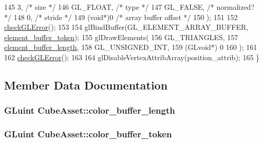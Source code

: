 \begin{DoxyCode}
145                         3,                             \textcolor{comment}{/* size */}
146                         GL\_FLOAT,                      \textcolor{comment}{/* type */}
147                         GL\_FALSE,                      \textcolor{comment}{/* normalized? */}
148                         0,                             \textcolor{comment}{/* stride */}
149                         (\textcolor{keywordtype}{void}*)0                       \textcolor{comment}{/* array buffer offset */}
150                         );
151 
152   \hyperlink{CubeAsset_8cc_a75f201b0e53e68726854997957322b8d}{checkGLError}();
153 
154   glBindBuffer(GL\_ELEMENT\_ARRAY\_BUFFER, \hyperlink{classCubeAsset_a4fae699256e7c5633a8174a93ca8a0ec}{element\_buffer\_token});
155   glDrawElements(
156                  GL\_TRIANGLES,
157                  \hyperlink{classCubeAsset_ac66c2ec869f392515dad4ebda1fe4792}{element\_buffer\_length},
158                  GL\_UNSIGNED\_INT,
159                  (GLvoid*) 0
160                  );
161 
162   \hyperlink{CubeAsset_8cc_a75f201b0e53e68726854997957322b8d}{checkGLError}();
163 
164   glDisableVertexAttribArray(position\_attrib);
165 \}
\end{DoxyCode}


\subsection{Member Data Documentation}
\hypertarget{classCubeAsset_ac4c2395c395e9bcebc5d15d425a505ec}{}
\subsubsection[{color\+\_\+buffer\+\_\+length}]{\setlength{\rightskip}{0pt plus 5cm}G\+Luint Cube\+Asset\+::color\+\_\+buffer\+\_\+length\hspace{0.3cm}{\ttfamily [private]}}\label{classCubeAsset_ac4c2395c395e9bcebc5d15d425a505ec}
\hypertarget{classCubeAsset_a4cb558d463a5fa01ba7fdd884e697a73}{}
\subsubsection[{color\+\_\+buffer\+\_\+token}]{\setlength{\rightskip}{0pt plus 5cm}G\+Luint Cube\+Asset\+::color\+\_\+buffer\+\_\+token\hspace{0.3cm}{\ttfamily [private]}}\label{classCubeAsset_a4cb558d463a5fa01ba7fdd884e697a73}
\hypertarget{classCubeAsset_ac66c2ec869f392515dad4ebda1fe4792}{}
